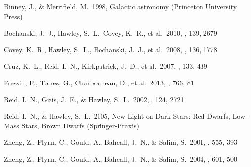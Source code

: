 \documentclass[preprint]{aastex}
\begin{document}
\begin{thebibliography}{}

 Binney, J.,
  \& Merrifield, M.\ 1998, Galactic astronomy (Princeton University
  Press)

 Bochanski,
  J.~J., Hawley, S.~L., Covey, K.~R., et al.\ 2010, \aj, 139, 2679


 Covey, K.~R.,
  Hawley, S.~L., Bochanski, J.~J., et al.\ 2008, \aj, 136, 1778

 Cruz, K.~L., Reid,
  I.~N., Kirkpatrick, J.~D., et al.\ 2007, \aj, 133, 439
  
 Fressin, F., Torres, 
G., Charbonneau, D., et al.\ 2013, \apj, 766, 81 

 Reid, I.~N., Gizis,
  J.~E., \& Hawley, S.~L.\ 2002, \aj, 124, 2721

 Reid, I.~N., \&
  Hawley, S.~L.\ 2005, New Light on Dark Stars: Red Dwarfs, Low-Mass
  Stars, Brown Dwarfs (Springer-Praxis)

 Zheng, Z., Flynn,
  C., Gould, A., Bahcall, J.~N., \& Salim, S.\ 2001, \apj, 555, 393

 Zheng, Z., Flynn,
  C., Gould, A., Bahcall, J.~N., \& Salim, S.\ 2004, \apj, 601, 500

\end{thebibliography}
\end{document}
